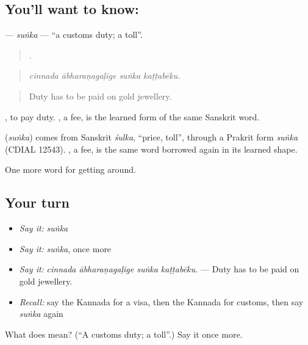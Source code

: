 \subsection*{You'll want to know: }
\textbf{} — \emph{suṅka} — \textquotedblleft{}a customs duty; a toll\textquotedblright{}.

\begin{quote}
   .
\end{quote}

\begin{quote}
\emph{cinnada ābharaṇagaḷige suṅka kaṭṭabēku.}
\end{quote}

\begin{quote}
Duty has to be paid on gold jewellery.
\end{quote}

 , to pay duty. , a fee, is the learned form of the same Sanskrit word.

\begin{cousinweb}
\textbf{} (\emph{suṅka}) comes from Sanskrit \emph{śulka}, \textquotedblleft{}price, toll\textquotedblright{}, through a Prakrit form \emph{suṅka} (CDIAL 12543). , a fee, is the same word borrowed again in its learned shape.
\end{cousinweb}

\begin{grammarlens}[title={What you've built}]
One more word for getting around.
\end{grammarlens}

\subsection*{Your turn}
\begin{itemize}
\raggedright
  \item \emph{Say it:} \emph{suṅka}
  \item \emph{Say it:} \emph{suṅka}, once more
  \item \emph{Say it:} \emph{cinnada ābharaṇagaḷige suṅka kaṭṭabēku.} — Duty has to be paid on gold jewellery.
  \item \emph{Recall:} say the Kannada for a visa, then the Kannada for customs, then say \emph{suṅka} again
\end{itemize}

\begin{tcolorbox}[breakable,colback=teal!4,colframe=teal!35!black,title={Before you move on}]
What does  mean? (\textquotedblleft{}A customs duty; a toll\textquotedblright{}.) Say it once more.
\end{tcolorbox}
